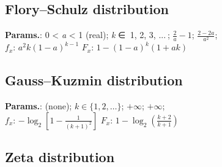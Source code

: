     
        
\subsection{Flory–Schulz distribution}





    {\color{darkblue} \textbf{Params.}:} {0 < \textit{a} < 1 (real)}; {\textit{k} ∈ { 1, 2, 3, ... }}; {$\frac{2}{a}-1$}; {$\frac{2-2 a}{a^2}$};\hspace{0.5cm}\\{\color{darkblue} \textbf{$f_x$}:} {$a^2 k (1-a)^{k-1}$}{\color{darkblue} \textbf{$F_x$}:} {$1-(1-a)^k (1+ a k) $}



    
        
\subsection{Gauss–Kuzmin distribution}





    {\color{darkblue} \textbf{Params.}:} {(none)}; {$k \in \{1,2,\ldots\}$}; {$+\infty$}; {$+\infty$};\hspace{0.5cm}\\{\color{darkblue} \textbf{$f_x$}:} {$-\log_2\left[ 1-\frac{1}{(k+1)^2}\right]$}{\color{darkblue} \textbf{$F_x$}:} {$1 - \log_2\left(\frac{k+2}{k+1}\right)$}



    
        
\subsection{Zeta distribution}


